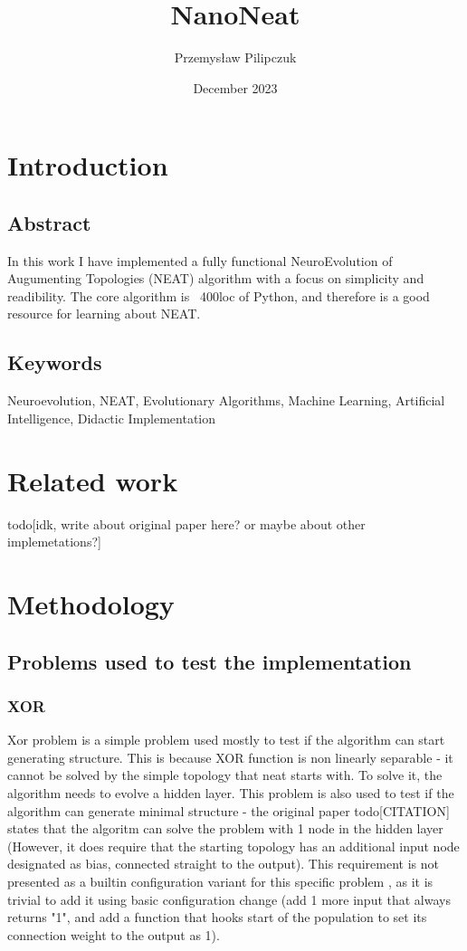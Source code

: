 \documentclass{article}
\title{NanoNeat}
\author{Przemysław Pilipczuk}
\date{December 2023}
\begin{document}
\maketitle

\tableofcontents
\section{Introduction}
\subsection{Abstract}
In this work I have implemented a fully functional NeuroEvolution of Augumenting Topologies (NEAT) algorithm 
with a focus on simplicity and readibility. The core algorithm is ~400loc of Python, and therefore is a 
good resource for learning about NEAT.
\subsection{Keywords}
Neuroevolution, NEAT, Evolutionary Algorithms, Machine Learning, Artificial Intelligence, Didactic Implementation
\section{Related work}
todo[idk, write about original paper here? or maybe about other implemetations?]
\section{Methodology}
    \subsection{Problems used to test the implementation}
        \subsubsection{XOR}
        Xor problem is a simple problem used mostly to test if the algorithm can start generating structure. 
        This is because XOR function is non linearly separable - it cannot be solved by the simple topology that neat starts with.
        To solve it, the algorithm needs to evolve a hidden layer. 
        This problem is also used to test if the algorithm can generate minimal structure - the original paper 
        todo[CITATION] states that the algoritm can solve the problem with 1 node in the hidden layer (However,
        it does require that the starting topology has an additional input node designated
        as bias, connected straight to the output). This requirement is not presented as a builtin configuration variant for this specific problem , as
        it is trivial to add it using basic configuration change (add 1 more input that always returns "1", and add a function that 
        hooks start of the population to set its connection weight to the output as 1).
\end{document}

